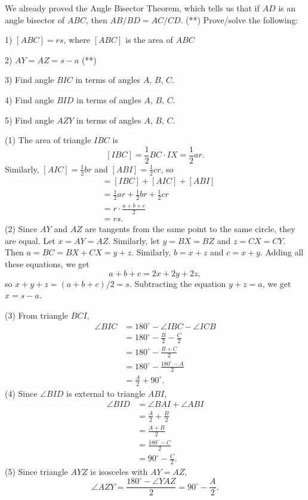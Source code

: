 We already proved the Angle Bisector Theorem, which tells us that if $AD$ is an angle bisector of $ABC$, then $AB/BD = AC/CD$. (**) Prove/solve the following:

1) $[ABC] = rs$, where $[ABC]$ is the area of $ABC$

2) $AY = AZ = s - a$ (**)

3) Find angle $BIC$ in terms of angles $A$, $B$, $C$.

4) Find angle $BID$ in terms of angles $A$, $B$, $C$.

5) Find angle $AZY$ in terms of angles $A$, $B$, $C$.

\begin{mdsoln}

(1) The area of triangle $IBC$ is
\[[IBC] = \frac{1}{2} BC \cdot IX = \frac{1}{2} ar.\]Similarly, $[AIC] = \frac{1}{2} br$ and $[ABI] = \frac{1}{2} cr$, so
\begin{align*}
[ABC] &= [IBC] + [AIC] + [ABI] \\
&= \frac{1}{2} ar + \frac{1}{2} br + \frac{1}{2} cr \\
&= r \cdot \frac{a + b + c}{2} \\
&= rs.
\end{align*}
(2) Since $AY$ and $AZ$ are tangents from the same point to the same circle, they are equal. Let $x = AY = AZ$. Similarly, let $y = BX = BZ$ and $z = CX = CY$. Then $a = BC = BX + CX = y + z$. Similarly, $b = x + z$ and $c = x + y$. Adding all these equations, we get
\[a + b + c = 2x + 2y + 2z,\]so $x + y + z = (a + b + c)/2 = s$. Subtracting the equation $y + z = a$, we get $x = s - a$.

(3) From triangle $BCI$,
\begin{align*}
\angle BIC &= 180^\circ - \angle IBC - \angle ICB \\
&= 180^\circ - \frac{B}{2} - \frac{C}{2} \\
&= 180^\circ - \frac{B + C}{2} \\
&= 180^\circ - \frac{180^\circ - A}{2} \\
&= \frac{A}{2} + 90^\circ.
\end{align*}
(4) Since $\angle BID$ is external to triangle $ABI$,
\begin{align*}
\angle BID &= \angle BAI + \angle ABI \\
&= \frac{A}{2} + \frac{B}{2} \\
&= \frac{A + B}{2} \\
&= \frac{180^\circ - C}{2} \\
&= 90^\circ - \frac{C}{2}.
\end{align*}
(5) Since triangle $AYZ$ is isosceles with $AY = AZ$,
\[\angle AZY = \frac{180^\circ - \angle YAZ}{2} = 90^\circ - \frac{A}{2}.\]
\end{mdsoln}


